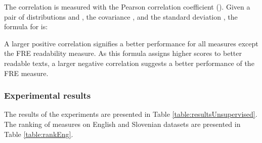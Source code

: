 \documentclass{clv3}
\begin{document}
The correlation is measured with the Pearson correlation coefficient (). Given a pair of distributions  and , the covariance , and the standard deviation , the formula for  is:



A larger positive correlation signifies a better performance for all measures except the FRE readability measure. As this formula assigns higher scores to better readable texts, a larger negative correlation suggests a better performance of the FRE measure. 

\subsubsection{Experimental results}
\label{sec-results-unsupervised}

The results of the experiments are presented in Table \ref{table:resultsUnsupervised}. The ranking of measures on English and Slovenian datasets are presented in Table \ref{table:rankEng}. 
\end{document}
